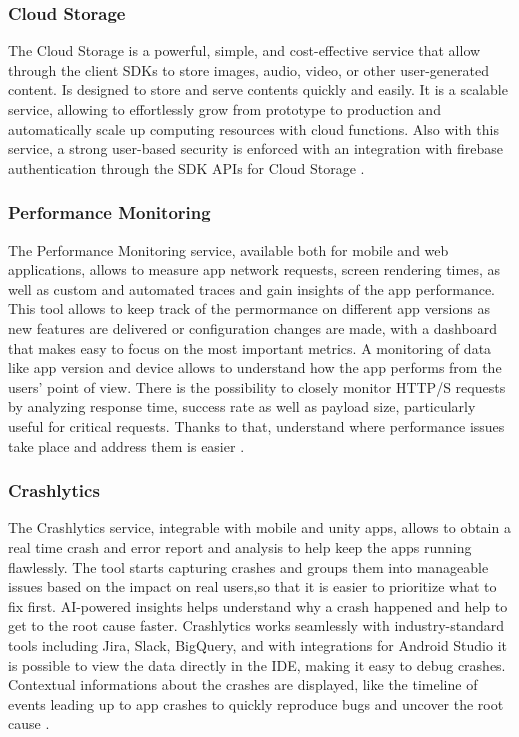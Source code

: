 \subsubsection{Cloud Storage}
The Cloud Storage is a powerful, simple, and cost-effective service that allow through the client SDKs to store images, audio, video, or other user-generated content. Is designed to store and serve contents quickly and easily. It is a scalable service, allowing to effortlessly grow from prototype to production and automatically scale up computing resources with cloud functions. Also with this service, a strong user-based security is enforced with an integration with firebase authentication through the SDK APIs for Cloud Storage \cite{CloudStorage}.
\subsubsection{Performance Monitoring}
The Performance Monitoring service, available both for mobile and web applications, allows to measure app network requests, screen rendering times, as well as custom and automated traces and gain insights of the app performance. This tool allows to keep track of the permormance on different app versions as new features are delivered or configuration changes are made, with a dashboard that makes easy to focus on the most important metrics. A monitoring of data like app version and device allows to understand how the app performs from the users' point of view. There is the possibility to closely monitor HTTP/S requests by analyzing response time, success rate as well as payload size, particularly useful for critical requests. Thanks to that, understand where performance issues take place and address them is easier \cite{PerformanceMonitoring}.
\subsubsection{Crashlytics}
The Crashlytics service, integrable with mobile and unity apps, allows to obtain a real time crash and error report and analysis to help keep the apps running flawlessly. The tool starts capturing crashes and groups them into manageable issues based on the impact on real users,so that it is easier to prioritize what to fix first. AI-powered insights helps understand why a crash happened and help to get to the root cause faster. Crashlytics works seamlessly with industry-standard tools including Jira, Slack, BigQuery, and with integrations for Android Studio it is possible to view the data directly in the IDE, making it easy to debug crashes. Contextual informations about the crashes are displayed, like the timeline of events leading up to app crashes to quickly reproduce bugs and uncover the root cause \cite{Crashlytics}.

